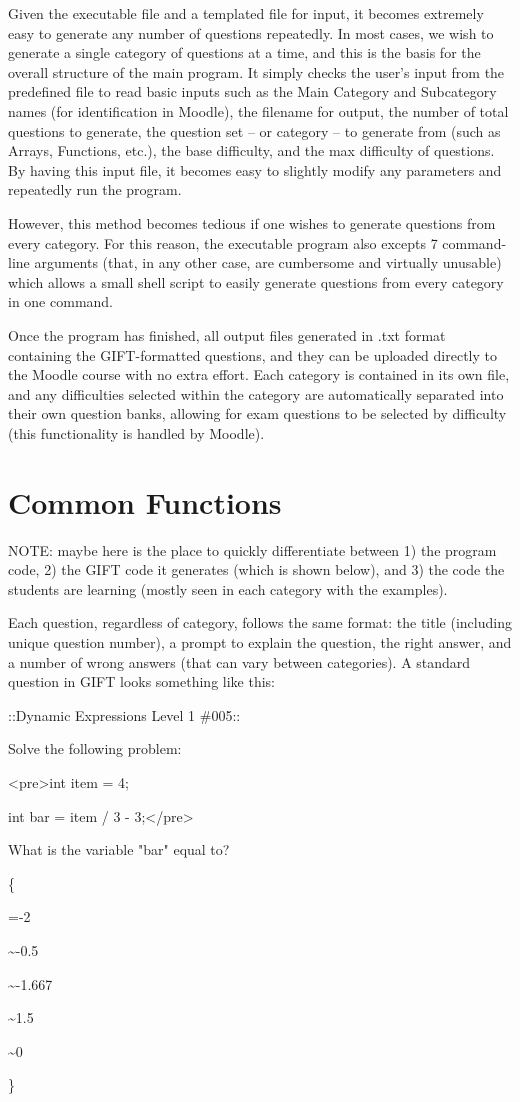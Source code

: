 \documentclass{article}
\begin{document}
Given the executable file and a templated file for input, it becomes extremely easy to generate any number of questions
repeatedly. In most cases, we wish to generate a single category of questions at a time, and this is the basis for the
overall structure of the main program. It simply checks the user's input from the predefined file to read basic inputs
such as the Main Category and Subcategory names (for identification in Moodle), the filename for output, the number of
total questions to generate, the question set -- or category -- to generate from (such as Arrays, Functions, etc.),
the base difficulty, and the max difficulty of questions. By having this input file, it becomes easy to slightly modify
any parameters and repeatedly run the program.

However, this method becomes tedious if one wishes to generate questions from every category. For this reason, the
executable program also excepts 7 command-line arguments (that, in any other case, are cumbersome and virtually
unusable) which allows a small shell script to easily generate questions from every category in one command.

Once the program has finished, all output files generated in .txt format containing the GIFT-formatted questions, and they can be uploaded
directly to the Moodle course with no extra effort. Each category is contained in its own file, and any
difficulties selected within the category are automatically separated into their own question banks, allowing
for exam questions to be selected by difficulty (this functionality is handled by Moodle).


\section{Common Functions}

NOTE: maybe here is the place to quickly differentiate between 1) the program code, 2) the GIFT code it generates (which is shown below), and 3) the code the students are learning (mostly seen in each category with the examples).

Each question, regardless of category, follows the same format: the title (including unique question number),
a prompt to explain the question, the right answer, and a number of wrong answers (that can vary between categories).
A standard question in GIFT looks something like this:

\hfill \par
::Dynamic Expressions Level 1 \#005:: \par
Solve the following problem: \par
\textless pre\textgreater int item = 4; \par
int bar = item / 3 - 3;\textless /pre\textgreater \par
What is the variable "bar" equal to? \par
	\{ \par
	=-2 \par
	\~{}-0.5 \par
	\~{}-1.667 \par
	\~{}1.5 \par
	\~{}0 \par
	\}
\hfill \par
\end{document}
